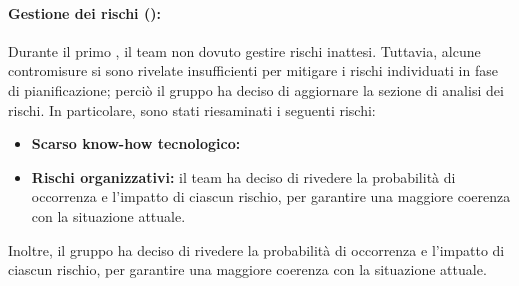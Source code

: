\paragraph*{Gestione dei rischi ():}
\par Durante il primo , il team non dovuto gestire rischi inattesi. Tuttavia, alcune contromisure si sono rivelate insufficienti per mitigare i rischi individuati in fase di pianificazione; perciò il gruppo ha deciso di aggiornare la sezione di analisi dei rischi. In particolare, sono stati riesaminati i seguenti rischi:
\begin{itemize}
  \item \textbf{Scarso know-how tecnologico:} 
  \item \textbf{Rischi organizzativi:} il team ha deciso di rivedere la probabilità di occorrenza e l'impatto di ciascun rischio, per garantire una maggiore coerenza con la situazione attuale.
\end{itemize}

\vspace{0.5\baselineskip}
\par Inoltre, il gruppo ha deciso di rivedere la probabilità di occorrenza e l'impatto di ciascun rischio, per garantire una maggiore coerenza con la situazione attuale.



